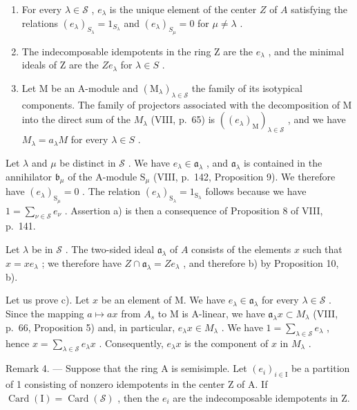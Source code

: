 \begin{enumerate}
\def\labelenumi{\alph{enumi})}
\item
  For every \(\lambda \in \mathcal{S}\) , \(e_{\lambda}\) is the unique element of the center \(Z\) of \(A\) satisfying the relations \((e_{\lambda})_{S_{\lambda}} = 1_{S_{\lambda}}\) and \((e_{\lambda})_{S_{\mu}} = 0\) for \(\mu \neq \lambda\) .
\item
  The indecomposable idempotents in the ring Z are the \(e_{\lambda}\) , and the minimal ideals of Z are the \(Ze_{\lambda}\) for \(\lambda \in S\) .
\item
  Let M be an A-module and \((\mathrm{M}_{\lambda})_{\lambda\in\mathcal{S}}\) the family of its isotypical components. The family of projectors associated with the decomposition of M into the direct sum of the \(M_{\lambda}\) (VIII, p.~65) is \(((e_{\lambda})_{\mathrm{M}})_{\lambda\in\mathcal{S}}\) , and we have \(M_{\lambda}=a_{\lambda}M\) for every \(\lambda\in S\) .
\end{enumerate}

Let \(\lambda\) and \(\mu\) be distinct in \(\mathcal{S}\) . We have \(e_{\lambda} \in \mathfrak{a}_{\lambda}\) , and \(\mathfrak{a}_{\lambda}\) is contained in the annihilator \(\mathfrak{b}_{\mu}\) of the A-module \(\mathrm{S}_{\mu}\) (VIII, p.~142, Proposition 9). We therefore have \((e_{\lambda})_{\mathrm{S}_{\mu}} = 0\) . The relation \((e_{\lambda})_{\mathrm{S}_{\lambda}} = 1_{\mathrm{S}_{\lambda}}\) follows because we have \(1 = \sum_{\nu \in \mathcal{S}} e_{\nu}\) . Assertion a) is then a consequence of Proposition 8 of VIII, p.~141.

Let \(\lambda\) be in \(\mathcal{S}\) . The two-sided ideal \(\mathfrak{a}_{\lambda}\) of \(A\) consists of the elements \(x\) such that \(x = xe_{\lambda}\) ; we therefore have \(Z \cap \mathfrak{a}_{\lambda} = Ze_{\lambda}\) , and therefore b) by Proposition 10, b).

Let us prove c). Let \(x\) be an element of M. We have \(e_{\lambda} \in \mathfrak{a}_{\lambda}\) for every \(\lambda \in \mathcal{S}\) . Since the mapping \(a \mapsto ax\) from \(A_s\) to M is A-linear, we have \(\mathfrak{a}_{\lambda}x \subset M_{\lambda}\) (VIII, p.~66, Proposition 5) and, in particular, \(e_{\lambda}x \in M_{\lambda}\) . We have \(1 = \sum_{\lambda \in \mathcal{S}} e_{\lambda}\) , hence \(x = \sum_{\lambda \in \mathcal{S}} e_{\lambda}x\) . Consequently, \(e_{\lambda}x\) is the component of \(x\) in \(M_{\lambda}\) .

Remark 4. --- Suppose that the ring A is semisimple. Let \((e_{i})_{i\in\mathrm{I}}\) be a partition of 1 consisting of nonzero idempotents in the center Z of A. If \(\operatorname{Card}(\mathrm{I})=\operatorname{Card}(\mathcal{S})\) , then the \(e_{i}\) are the indecomposable idempotents in Z.


